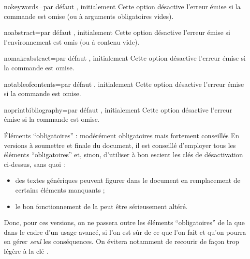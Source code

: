 \begin{description}
\begin{docKey}{nokeywords}{=\textbar{}}{par
      défaut , initialement }
    Cette option désactive l'erreur émise si la commande  est
    omise (ou à arguments obligatoires vides).
  \end{docKey}
  \begin{docKey}{noabstract}{=\textbar{}}{par
      défaut , initialement }
    Cette option désactive l'erreur émise si l'environnement 
    est omis (ou à contenu vide).
  \end{docKey}
  \begin{docKey}{nomakeabstract}{=\textbar{}}{par
      défaut , initialement }
    Cette option désactive l'erreur émise si la commande 
    est omise.
  \end{docKey}
  \begin{docKey}{notableofcontents}{=\textbar{}}{par
      défaut , initialement }
    Cette option désactive l'erreur émise si la commande
     est omise.
  \end{docKey}
  \begin{docKey}{noprintbibliography}{=\textbar{}}{par
      défaut , initialement }
    Cette option désactive l'erreur émise si la commande
     est omise.
  \end{docKey}
\end{description}

\begin{dbwarning}{Éléments \enquote{obligatoires} : modérément obligatoires
    mais fortement conseillés}{}
  En versions à soumettre et finale du document, il est conseillé d'employer
  tous les éléments \enquote{obligatoires} et, sinon, d'utiliser à bon escient
  les clés de désactivation ci-dessus, sans quoi :
  \begin{itemize}
  \item des textes génériques peuvent figurer dans le document en remplacement
    de certains éléments manquants ;
  \item le bon fonctionnement de la \yatcl{} peut être sérieusement altéré.
  \end{itemize}
  Donc, pour ces versions, on ne passera outre les éléments
  \enquote{obligatoires} de la \yatcl{} que dans le cadre d'un usage avancé, si
  l'on est sûr de ce que l'on fait et qu'on pourra en gérer \emph{seul} les
  conséquences.  On évitera notamment de recourir de façon trop légère à la clé
  .
\end{dbwarning}

%
\iffalse
\fi
